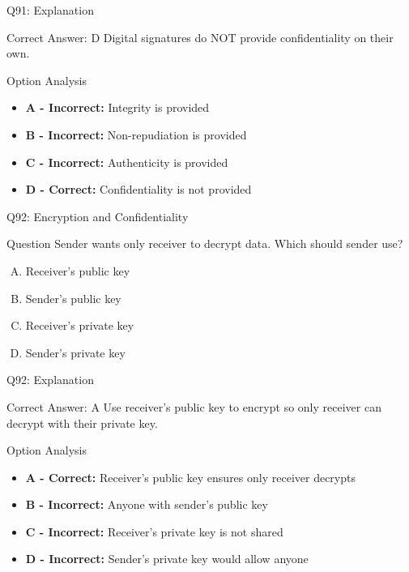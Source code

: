 \documentclass{beamer}
\begin{document}
	\begin{frame}{Q91: Explanation}
		\begin{block}{Correct Answer: D}
			Digital signatures do NOT provide confidentiality on their own.
		\end{block}
		\begin{block}{Option Analysis}
			\begin{itemize}
				\item \textbf{A - Incorrect:} Integrity is provided
				\item \textbf{B - Incorrect:} Non-repudiation is provided
				\item \textbf{C - Incorrect:} Authenticity is provided
				\item \textbf{D - Correct:} Confidentiality is not provided
			\end{itemize}
		\end{block}
	\end{frame}
	
	\begin{frame}{Q92: Encryption and Confidentiality}
		\begin{block}{Question}
			Sender wants only receiver to decrypt data. Which should sender use?
		\end{block}
		\begin{enumerate}[(A)]
			\item Receiver's public key
			\item Sender's public key
			\item Receiver's private key
			\item Sender's private key
		\end{enumerate}
	\end{frame}
	
	\begin{frame}{Q92: Explanation}
		\begin{block}{Correct Answer: A}
			Use receiver's public key to encrypt so only receiver can decrypt with their private key.
		\end{block}
		\begin{block}{Option Analysis}
			\begin{itemize}
				\item \textbf{A - Correct:} Receiver's public key ensures only receiver decrypts
				\item \textbf{B - Incorrect:} Anyone with sender's public key
				\item \textbf{C - Incorrect:} Receiver's private key is not shared
				\item \textbf{D - Incorrect:} Sender's private key would allow anyone
			\end{itemize}
		\end{block}
	\end{frame}
	
\end{document}
